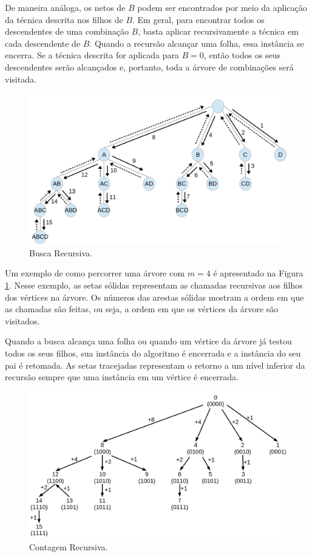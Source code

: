 De maneira análoga, os netos de $B$ podem ser encontrados por meio da aplicação da técnica descrita nos filhos de $B$. Em geral, para encontrar todos os descendentes de uma combinação $B$, basta aplicar recursivamente a técnica em cada descendente de $B$. Quando a recursão alcançar uma folha, essa instância se encerra. Se a técnica descrita for aplicada para $B=0$, então todos os seus descendentes serão alcançados e, portanto, toda a árvore de combinações será visitada. 

\begin{figure}[htb]
\centering
\includegraphics[width=1\textwidth]{figs/buscarecursiva}
\caption[Busca Recursiva.]
{Busca Recursiva.}
\label{fig:buscarecursiva}
\end{figure}

Um exemplo de como percorrer uma árvore com $m=4$ é apresentado na Figura \ref{fig:buscarecursiva}. Nesse exemplo, as setas sólidas representam as chamadas recursivas aos filhos dos vértices na árvore. Os números das arestas sólidas mostram a ordem em que as chamadas são feitas, ou seja, a ordem em que os vértices da árvore são visitados.

Quando a busca alcança uma folha ou quando um vértice da árvore já testou todos os seus filhos, sua instância do algoritmo é encerrada e a instância do seu pai é retomada. As setas tracejadas representam o retorno a um nível inferior da recursão sempre que uma instância em um vértice é encerrada. 

\begin{figure}[htb]
\centering
\includegraphics[width=1\textwidth]{figs/contagemrecursiva}
\caption[Contagem Recursiva.]
{Contagem Recursiva.}
\label{fig:contagemrecursiva}
\end{figure}


